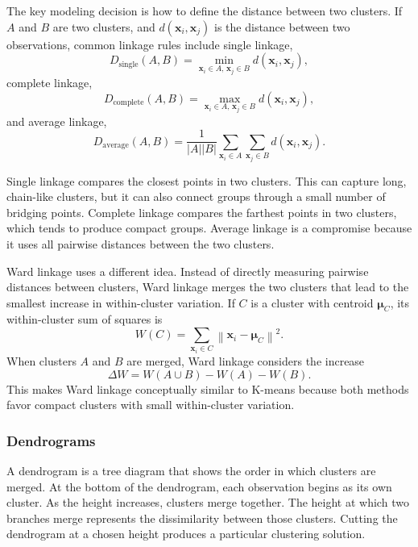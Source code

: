 \documentclass[12pt,letter]{article}
\begin{document}
The key modeling decision is how to define the distance between two clusters. If \(A\) and \(B\) are two clusters, and \(d(\mathbf{x}_i,\mathbf{x}_j)\) is the distance between two observations, common linkage rules include single linkage,
\begin{equation}
    D_{\text{single}}(A,B)
    =
    \min_{\mathbf{x}_i\in A,\,\mathbf{x}_j\in B}
    d(\mathbf{x}_i,\mathbf{x}_j),
\end{equation}
complete linkage,
\begin{equation}
    D_{\text{complete}}(A,B)
    =
    \max_{\mathbf{x}_i\in A,\,\mathbf{x}_j\in B}
    d(\mathbf{x}_i,\mathbf{x}_j),
\end{equation}
and average linkage,
\begin{equation}
    D_{\text{average}}(A,B)
    =
    \frac{1}{|A||B|}
    \sum_{\mathbf{x}_i\in A}\sum_{\mathbf{x}_j\in B}
    d(\mathbf{x}_i,\mathbf{x}_j).
\end{equation}

Single linkage compares the closest points in two clusters. This can capture long, chain-like clusters, but it can also connect groups through a small number of bridging points. Complete linkage compares the farthest points in two clusters, which tends to produce compact groups. Average linkage is a compromise because it uses all pairwise distances between the two clusters.

Ward linkage uses a different idea. Instead of directly measuring pairwise distances between clusters, Ward linkage merges the two clusters that lead to the smallest increase in within-cluster variation. If \(C\) is a cluster with centroid \(\boldsymbol{\mu}_C\), its within-cluster sum of squares is
\begin{equation}
    W(C)=\sum_{\mathbf{x}_i\in C}\left\lVert \mathbf{x}_i-\boldsymbol{\mu}_C\right\rVert^2.
\end{equation}
When clusters \(A\) and \(B\) are merged, Ward linkage considers the increase
\begin{equation}
    \Delta W = W(A\cup B)-W(A)-W(B).
\end{equation}
This makes Ward linkage conceptually similar to K-means because both methods favor compact clusters with small within-cluster variation.

\subsubsection{Dendrograms}

A dendrogram is a tree diagram that shows the order in which clusters are merged. At the bottom of the dendrogram, each observation begins as its own cluster. As the height increases, clusters merge together. The height at which two branches merge represents the dissimilarity between those clusters. Cutting the dendrogram at a chosen height produces a particular clustering solution.
\end{document}
